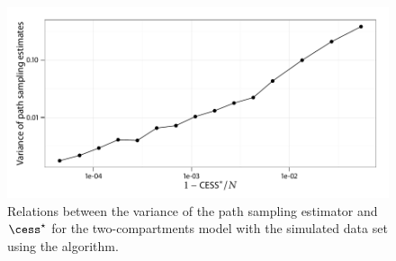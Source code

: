 \begin{figure}[t]
  \linespread{1.1}\selectfont
  \includegraphics[width=\linewidth]{fig_src/CESS_Path_Var}
  \caption[Relations between the variance of the path sampling estimator and
  \protect\cess]
  {Relations between the variance of the path sampling estimator and
    $\cess^\star$ for the two-compartments \pet model with the simulated data
  set using the \smc[2] algorithm.}
  \label{fig:cess path var}
\end{figure}

